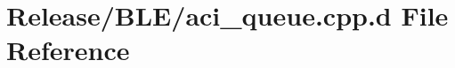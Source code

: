 \hypertarget{_release_2_b_l_e_2aci__queue_8cpp_8d}{\section{\-Release/\-B\-L\-E/aci\-\_\-queue.cpp.\-d \-File \-Reference}
\label{_release_2_b_l_e_2aci__queue_8cpp_8d}
}
